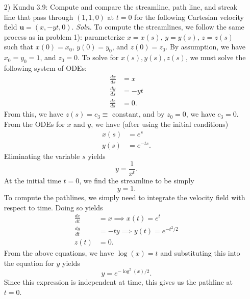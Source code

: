 \documentclass{article}
\begin{document}
\begin{itemize}
    \item[2)] Kundu 3.9: Compute and compare the streamline, path line, and streak line that pass through $(1,1,0)$ at $t = 0$ for the following Cartesian velocity field $\mathbf{u} = (x,-yt,0)$.
    \newline\newline
    \textit{Soln.} To compute the streamlines, we follow the same process as in problem 1): parameterize $x = x(s)$, $y = y(s)$, $z = z(s)$ such that $x(0) = x_0$, $y(0) = y_0$, and $z(0) = z_0$. By assumption, we have $x_0 = y_0 = 1$, and $z_0 = 0$. To solve for $x(s),y(s), z(s)$, we must solve the following system of ODEs:
    \begin{align*}
        \frac{d x}{ds} &= x\\
        \frac{dy}{ds} &= -yt\\
        \frac{dz}{ds} &= 0.
    \end{align*}
    From this, we have $z(s) = c_3 \equiv $ constant, and by $z_0 = 0$, we have $c_3 = 0$. From the ODEs for $x$ and $y$, we have (after using the initial conditions)
    \begin{align*}
        x(s) &= e^{s}\\
        y(s) &= e^{-ts}.
    \end{align*}
    Eliminating the variable $s$ yields
    \[y = \frac{1}{x^t}.\]
    At the initial time $t = 0$, we find the streamline to be simply
    \[y = 1.\]
    To compute the pathlines, we simply need to integrate the velocity field with respect to time. Doing so yields 
    \begin{align*}
        \frac{dx}{dt} &= x \implies x(t) = e^t\\
        \frac{dy}{dt} &= -ty \implies y(t) = e^{-t^2/2}\\
        z(t) &= 0.
    \end{align*}
    From the above equations, we have $\log(x) = t$ and substituting this into the equation for $y$ yields
    \[y = e^{-\log^2(x)/2}.\]
    Since this expression is independent at time, this gives us the pathline at $t = 0$.
    \newline\newline


\end{itemize}
\end{document}
